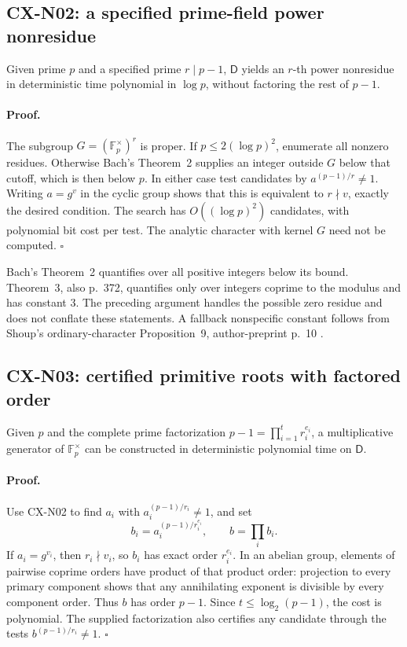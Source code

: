 \documentclass[11pt,a4paper]{article}
\begin{document}
\subsection{CX-N02: a specified prime-field power nonresidue}
\label{cx-n02}

Given prime \(p\) and a specified prime \(r\mid p-1\), \(\mathsf D\) yields
an \(r\)-th power nonresidue in deterministic time polynomial in
\(\log p\), without factoring the rest of \(p-1\).

\paragraph{Proof.}
The subgroup \(G=(\mathbb F_p^\times)^r\) is proper.
If \(p\leq2(\log p)^2\), enumerate all nonzero residues.
Otherwise Bach's Theorem~2 supplies an integer outside \(G\) below that
cutoff, which is then below \(p\). In either case test candidates by
\(a^{(p-1)/r}\ne1\). Writing \(a=g^v\) in the cyclic group shows that this
is equivalent to \(r\nmid v\), exactly the desired condition.
The search has \(O((\log p)^2)\) candidates, with polynomial bit cost per
test. The analytic character with kernel \(G\) need not be computed.
\(\square\)

Bach's Theorem~2 quantifies over all positive integers below its bound.
Theorem~3, also p.~372, quantifies only over integers coprime to the modulus
and has constant \(3\). The preceding argument handles the possible zero
residue and does not conflate these statements. A fallback nonspecific
constant follows from Shoup's ordinary-character Proposition~9,
author-preprint p.~10 \cite{CXNShoup92}.

\subsection{CX-N03: certified primitive roots with factored order}
\label{cx-n03}

Given \(p\) and the complete prime factorization
\(p-1=\prod_{i=1}^t r_i^{e_i}\), a multiplicative generator of
\(\mathbb F_p^\times\) can be constructed in deterministic polynomial time
on \(\mathsf D\).

\paragraph{Proof.}
Use CX-N02 to find \(a_i\) with \(a_i^{(p-1)/r_i}\ne1\), and set
\[
              b_i=a_i^{(p-1)/r_i^{e_i}},\qquad b=\prod_i b_i .
\]
If \(a_i=g^{v_i}\), then \(r_i\nmid v_i\), so \(b_i\) has exact order
\(r_i^{e_i}\). In an abelian group, elements of pairwise coprime orders
have product of that product order: projection to every primary component
shows that any annihilating exponent is divisible by every component
order. Thus \(b\) has order \(p-1\). Since \(t\leq\log_2(p-1)\), the cost
is polynomial. The supplied factorization also certifies any candidate
through the tests \(b^{(p-1)/r_i}\ne1\). \(\square\)
\end{document}

